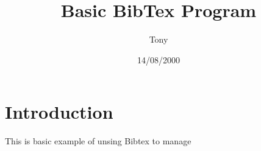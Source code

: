 \documentclass{article}
\begin{document}
	\title{Basic BibTex Program}
	\author{Tony}
	\date{14/08/2000}
	\maketitle
	
	\section{Introduction}
	This is basic example of unsing Bibtex to manage
\end{document}
